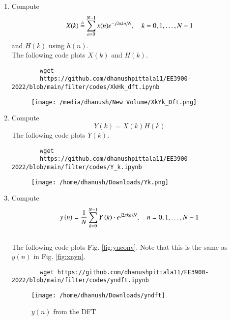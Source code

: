 \documentclass[journal,12pt,twocolumn]{IEEEtran}
\renewcommand\thesection{\arabic{section}}
\begin{document}
\begin{enumerate}[label=\thesection.\arabic*]
	\item
	Compute
	\begin{equation}
		X(k) \stackrel{\triangle}{=} \sum _{n=0}^{N-1}x(n) e^{-j2\pi kn/N}, \quad k = 0,1,\dots, N-1
	\end{equation}
	and $H(k)$ using $h(n)$.\\
	\solution The following code plots $X(k)$ and $H(k)$.
	\begin{lstlisting}
		wget
		https://github.com/dhanushpittala11/EE3900-2022/blob/main/filter/codes/XkHk_dft.ipynb
	\end{lstlisting}
	
	\begin{figure}[!ht]
		\centering
		\texttt{[image: /media/dhanush/New Volume/XkYk\_Dft.png]}
		\caption{}
		\label{fig:Hk_Xk}
	\end{figure}
	
	\item Compute 
	\begin{equation}
		Y(k) = X(k)H(k)
	\end{equation}
	\solution The following code plots $Y(k)$.
	\begin{lstlisting}
		wget
		https://github.com/dhanushpittala11/EE3900-2022/blob/main/filter/codes/Y_k.ipynb
	\end{lstlisting}
	
	\begin{figure}[!ht]
		\centering
		\texttt{[image: /home/dhanush/Downloads/Yk.png]}
		\caption{}
		\label{fig:Yk}
	\end{figure}
	
	\item Compute
	\begin{equation}
		y\left(n\right)={\frac {1}{N}}\sum _{k=0}^{N-1}Y\left(k\right)\cdot e^{j 2\pi kn/N},\quad n = 0,1,\dots, N-1
	\end{equation}
	\\
	\solution The following code plots Fig. \ref{fig:ynconv}. Note that this is the same as 
	$y(n)$ in  Fig. 
	\ref{fig:xnyn}. 
	\begin{lstlisting}
		wget https://github.com/dhanushpittala11/EE3900-2022/blob/main/filter/codes/yndft.ipynb
	\end{lstlisting}
	\begin{figure}[!ht]
		\centering
		\texttt{[image: /home/dhanush/Downloads/yndft]}
		\caption{$y(n)$ from the DFT}
		\label{fig:yndft}
	\end{figure}
	

\end{enumerate}
\end{document}
